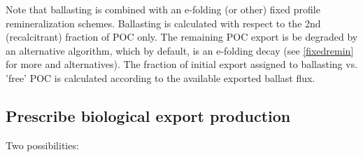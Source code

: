 \documentclass[10pt,twoside]{article}
\begin{document}
Note that ballasting is combined with an e-folding (or other) fixed profile remineralization schemes. Ballasting is calculated with respect to the 2nd (recalcitrant) fraction of POC only. The remaining POC export is be degraded by an alternative algorithm, which by default, is an e-folding decay (see \ref{fixedremin} for more and alternatives). The fraction of initial export assigned to ballasting vs. 'free' POC is calculated according to the available exported ballast flux.




\subsection{Prescribe biological export production}\label{Prescribe biological export production}

Two possibilities:
\end{document}
